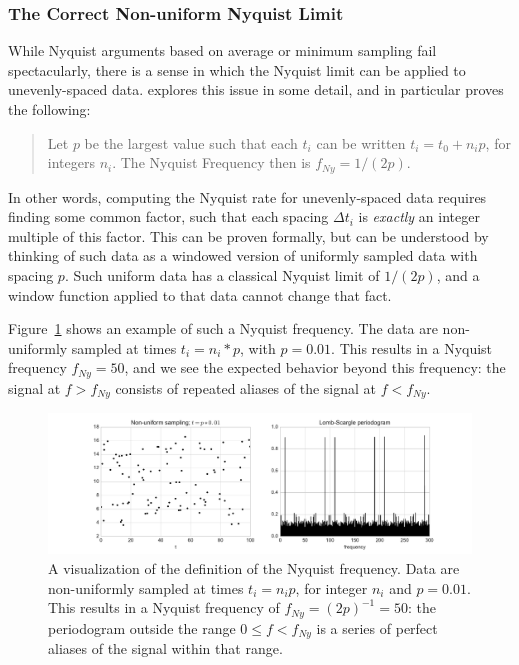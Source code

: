 \documentclass[preprint]{aastex}
\newcommand{\Fig}[1]{Figure~\ref{fig:#1}}
\newcommand{\figlabel}[1]{\label{fig:#1}}
\begin{document}
\subsubsection{The Correct Non-uniform Nyquist Limit}

While Nyquist arguments based on average or minimum sampling fail spectacularly,
there is a sense in which the Nyquist limit can be applied to unevenly-spaced
data. \citet{Eyer99} explores this issue in some detail, and in particular
proves the following:
\begin{quote}
Let $p$ be the largest value such that each $t_i$ can be written $t_i = t_0 + n_i p$, for integers $n_i$. The Nyquist Frequency then is $f_{Ny} = 1 / (2p)$.
\end{quote}
In other words, computing the Nyquist rate for unevenly-spaced data requires
finding some common factor, such that each spacing $\Delta t_i$ is {\it exactly}
an integer multiple of this factor.
This can be proven formally, but can be understood by thinking of such data as
a windowed version of uniformly sampled data with spacing $p$.
Such uniform data has a classical Nyquist limit of $1/(2p)$, and a window function applied to that data cannot change that fact.

\Fig{nyquist-eyer99} shows an example of such a Nyquist frequency.
The data are non-uniformly sampled at times $t_i = n_i * p$, with $p=0.01$.
This results in a Nyquist frequency $f_{Ny} = 50$, and we see the expected
behavior beyond this frequency: the signal at $f > f_{Ny}$ consists of repeated
aliases of the signal at $f < f_{Ny}$.

\begin{figure}[ht]
  \centering
  \includegraphics[width=\textwidth]{fig13_nyquist_eyer99}
  \caption{A visualization of the \citep{Eyer99} definition of the Nyquist
    frequency. Data are non-uniformly sampled at times $t_i = n_i p$, for
    integer $n_i$ and $p=0.01$.
    This results in a Nyquist frequency of $f_{Ny}= (2p)^{-1} = 50$:
    the periodogram outside the range $0 \le f < f_{Ny}$ is a series of
    perfect aliases of the signal within that range.
    \figlabel{nyquist-eyer99}}
\end{figure}
\end{document}
